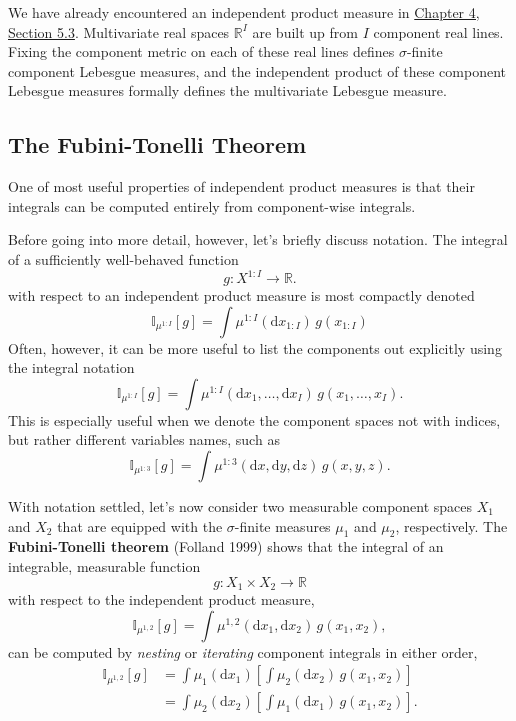 \documentclass[
  letterpaper,
  DIV=11,
  numbers=noendperiod]{scrartcl}
\begin{document}
We have already encountered an independent product measure in
\href{http://www.symplectomorphic.com/assets/chapters_html/probability_on_general_spaces.html\#the-lebesgue-measure-on-multivariate-real-spaces}{Chapter
4, Section 5.3}. Multivariate real spaces \(\mathbb{R}^{I}\) are built
up from \(I\) component real lines. Fixing the component metric on each
of these real lines defines \(\sigma\)-finite component Lebesgue
measures, and the independent product of these component Lebesgue
measures formally defines the multivariate Lebesgue measure.

\subsection{The Fubini-Tonelli Theorem}\label{sec:fubini}

One of most useful properties of independent product measures is that
their integrals can be computed entirely from component-wise integrals.

Before going into more detail, however, let's briefly discuss notation.
The integral of a sufficiently well-behaved function \[
g : X^{1:I} \rightarrow \mathbb{R}.
\] with respect to an independent product measure is most compactly
denoted \[
\mathbb{I}_{ \mu^{1:I} } [ g ]
=
\int \mu^{1:I}( \mathrm{d} x_{1:I} ) \,
g( x_{1:I} )
\] Often, however, it can be more useful to list the components out
explicitly using the integral notation \[
\mathbb{I}_{ \mu^{1:I} } [ g ]
=
\int \mu^{1:I}( \mathrm{d} x_{1}, \ldots, \mathrm{d} x_{I} ) \,
g( x_{1}, \ldots, x_{I} ).
\] This is especially useful when we denote the component spaces not
with indices, but rather different variables names, such as \[
\mathbb{I}_{ \mu^{1:3} } [ g ]
=
\int \mu^{1:3}( \mathrm{d} x, \mathrm{d} y, \mathrm{d} z ) \,
g( x, y, z ).
\]

With notation settled, let's now consider two measurable component
spaces \(X_{1}\) and \(X_{2}\) that are equipped with the
\(\sigma\)-finite measures \(\mu_{1}\) and \(\mu_{2}\), respectively.
The \textbf{Fubini-Tonelli theorem} (Folland 1999) shows that the
integral of an integrable, measurable function \[
g : X_{1} \times X_{2} \rightarrow \mathbb{R}
\] with respect to the independent product measure, \[
\mathbb{I}_{ \mu^{1,2} }[ g ]
=
\int \mu^{1,2}( \mathrm{d} x_{1}, \mathrm{d} x_{2} ) \,
g( x_{1}, x_{2} ),
\] can be computed by \emph{nesting} or \emph{iterating} component
integrals in either order, \begin{align*}
\mathbb{I}_{ \mu^{1,2} }[ g ]
&=
\int \mu_{1} ( \mathrm{d} x_{1} )
\left[
  \int \mu_{2} ( \mathrm{d} x_{2} ) \, g( x_{1}, x_{2} )
\right]
\\
&=
\int \mu_{2} ( \mathrm{d} x_{2} )
\left[
  \int \mu_{1} ( \mathrm{d} x_{1} ) \, g( x_{1}, x_{2} )
\right].
\end{align*}
\end{document}
